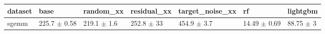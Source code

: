 \begin{tabular}{lllllll}
\toprule
dataset & base & random\_xx & residual\_xx & target\_noise\_xx & rf & lightgbm \\
\midrule
sgemm & 225.7 $\pm$ 0.58 & 219.1 $\pm$ 1.6 & 252.8 $\pm$ 33 & 454.9 $\pm$ 3.7 & 14.49 $\pm$ 0.69 & 88.75 $\pm$ 3 \\
\bottomrule
\end{tabular}
